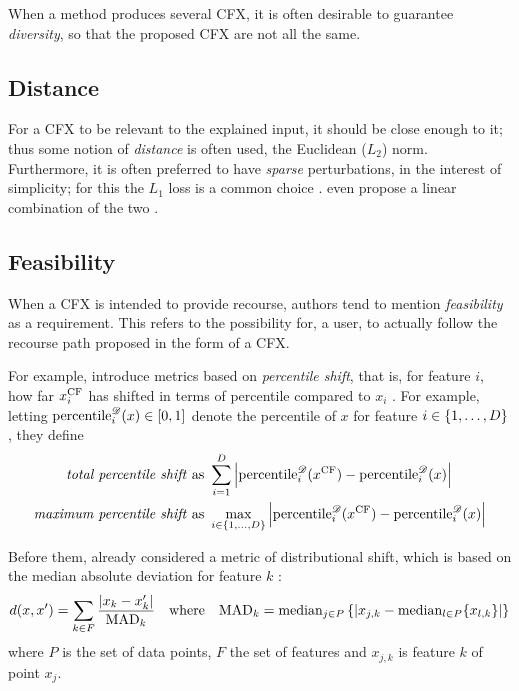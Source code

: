 \documentclass[../main.tex]{subfiles}
\begin{document}
When a method produces several CFX, it is often desirable to guarantee \emph{diversity}, so that the proposed CFX are not all the same.

\subsection{Distance}

For a CFX to be relevant to the explained input, it should be close enough to it; thus some notion of \emph{distance} is often used, \eg{} the Euclidean ($L_2$) norm.
Furthermore, it is often preferred to have \emph{sparse} perturbations, in the interest of simplicity; for this the $L_1$ loss is a common choice \cite{joshiRealistic2019,antoranGetting2021}.
\citeauthor{vanlooverenInterpretable2021} even propose a linear combination of the two \cite{vanlooverenInterpretable2021}.

\subsection{Feasibility}

When a CFX is intended to provide recourse, authors tend to mention \emph{feasibility} as a requirement.
This refers to the possibility for, \eg{} a user, to actually follow the recourse path proposed in the form of a CFX.

For example, \citeauthor{pawelczykLearning2020} introduce metrics based on \emph{percentile shift}, that is, for feature $i$, how far $x^\mathrm{CF}_i$ has shifted in terms of percentile compared to $x_i$ \cite{pawelczykLearning2020}.
For example, letting $\text{percentile}_i^{\mathscr{D}}(x) \in [0, 1]$ denote the percentile of $x$ for feature $i \in \{1, \ldots, D\}$, they define
\begin{align*}
    \text{\emph{total percentile shift} as }   & \sum_{i=1}^D \left\lvert \text{percentile}_i^{\mathscr{D}}(x^\mathrm{CF}) - \text{percentile}_i^{\mathscr{D}}(x) \right\rvert                  \\
    \text{\emph{maximum percentile shift} as } & \max_{i \in \{1, \ldots, D\}} \left\lvert \text{percentile}_i^{\mathscr{D}}(x^\mathrm{CF}) - \text{percentile}_i^{\mathscr{D}}(x) \right\rvert
\end{align*}

Before them, \citeauthor{wachterCounterfactual2017} already considered a metric of distributional shift, which is based on the median absolute deviation for feature $k$ \cite{wachterCounterfactual2017}:
\begin{align*}
	d(x, x') = \sum_{k \in F} \frac{\left\lvert x_k - x'_k\right\rvert}{\text{MAD}_k}
	 \quad \text{where} \quad
	\text{MAD}_k
	= \text{median}_{j \in P} \left\{
	\left\lvert
		x_{j,k} - \text{median}_{l \in P} \{ x_{l, k} \}
	\right\rvert
	\right\}
\end{align*}
where $P$ is the set of data points, $F$ the set of features and $x_{j, k}$ is feature $k$ of point $x_j$.
\end{document}
